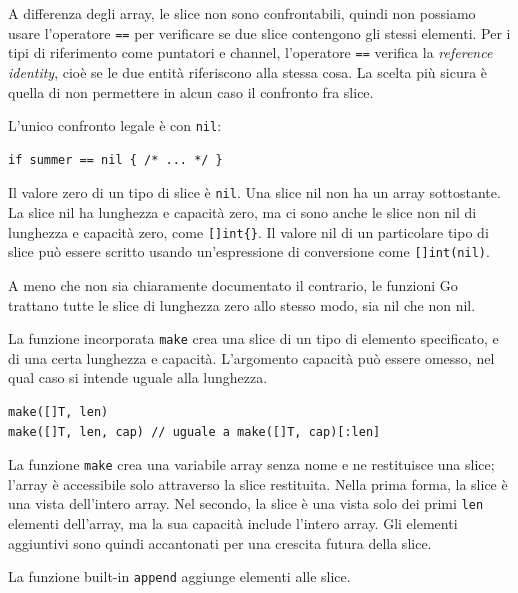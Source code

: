A differenza degli array, le slice non sono confrontabili, quindi non possiamo usare l'operatore \verb|==| per verificare se due slice contengono gli stessi elementi.
Per i tipi di riferimento come puntatori e channel, l'operatore \verb|==| verifica la \textit{reference identity}, cioè se le due entità riferiscono alla stessa cosa.
La scelta più sicura è quella di non permettere in alcun caso il confronto fra slice.

L'unico confronto legale è con \verb|nil|:
\begin{lstlisting}[frame=single, label={lst:lstlisting3-2.6}]
if summer == nil { /* ... */ }
\end{lstlisting}
Il valore zero di un tipo di slice è \verb|nil|.
Una slice nil non ha un array sottostante.
La slice nil ha lunghezza e capacità zero, ma ci sono anche le slice non nil di lunghezza e capacità zero, come \verb|[]int{}|.
Il valore nil di un particolare tipo di slice può essere scritto usando un'espressione di conversione come \verb|[]int(nil)|.

A meno che non sia chiaramente documentato il contrario, le funzioni Go trattano tutte le slice di lunghezza zero allo stesso modo, sia nil che non nil.

La funzione incorporata \verb|make| crea una slice di un tipo di elemento specificato, e di una certa lunghezza e capacità.
L'argomento capacità può essere omesso, nel qual caso si intende uguale alla lunghezza.
\begin{lstlisting}[frame=single, label={lst:lstlisting3-2.7}]
make([]T, len)
make([]T, len, cap) // uguale a make([]T, cap)[:len]
\end{lstlisting}
La funzione \verb|make| crea una variabile array senza nome e ne restituisce una slice;
l'array è accessibile solo attraverso la slice restituita.
Nella prima forma, la slice è una vista dell'intero array.
Nel secondo, la slice è una vista solo dei primi \verb|len| elementi dell'array, ma la sua capacità include l'intero array.
Gli elementi aggiuntivi sono quindi accantonati per una crescita futura della slice.

La funzione built-in \verb|append| aggiunge elementi alle slice.

